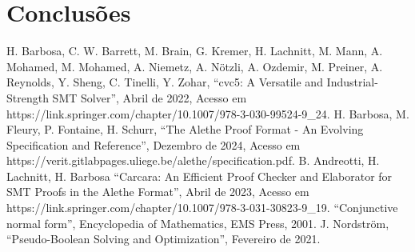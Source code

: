 \documentclass[conference]{IEEEtran}
\begin{document}

\section*{Conclusões}

\begin{thebibliography}{00}
              H. Barbosa, C. W. Barrett, M. Brain, G. Kremer, H. Lachnitt, M. Mann, A. Mohamed, M. Mohamed, A. Niemetz, A. Nötzli, A. Ozdemir, M. Preiner, A. Reynolds, Y. Sheng, C. Tinelli, Y. Zohar, ``cvc5: A Versatile and Industrial-Strength SMT Solver'', Abril de 2022, Acesso em https://link.springer.com/chapter/10.1007/978-3-030-99524-9\_24.
            H. Barbosa, M. Fleury, P. Fontaine, H. Schurr, ``The Alethe Proof Format - An Evolving Specification and Reference'', Dezembro de 2024, Acesso em https://verit.gitlabpages.uliege.be/alethe/specification.pdf.
           B. Andreotti, H. Lachnitt, H. Barbosa ``Carcara: An Efficient Proof Checker and Elaborator for SMT Proofs in the Alethe Format'', Abril de 2023, Acesso em https://link.springer.com/chapter/10.1007/978-3-031-30823-9\_19.
               ``Conjunctive normal form'', Encyclopedia of Mathematics, EMS Press, 2001.
           J. Nordström, ``Pseudo-Boolean Solving and Optimization'', Fevereiro de 2021.
\end{thebibliography}
\end{document}
